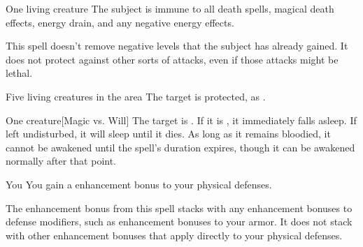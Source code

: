 \spellrng{\rngclose}
\spelldur{\durshort}
\begin{spelltarget}{One living creature}
    \spelleffect The subject is immune to all death spells, magical death effects, energy drain, and any negative energy effects.
\end{spelltarget}
\spellnotes This spell doesn't remove negative levels that the subject has already gained. It does not protect against other sorts of attacks, even if those attacks might be lethal.

\spelldur{\durshort}
\begin{spelltarget}{Five living creatures in the area}
    \spelleffect The target is protected, as .
\end{spelltarget}

\spellrng{\rngmed}
\spelldur{\durlong}
\begin{spelltarget}{One creature}[Magic vs. Will]
    \spellsuccess The target is \bewildered. If it is \bloodied, it immediately falls asleep. If left undisturbed, it will sleep until it dies. As long as it remains bloodied, it cannot be awakened until the spell's duration expires, though it can be awakened normally after that point.
\end{spelltarget}

\spelldur{\durlong}
\begin{spelltarget}{You}
    \spelleffect You gain a  enhancement bonus to your physical defenses. \spellbonusscalingdescription
\end{spelltarget}
\spellnotes The enhancement bonus from this spell stacks with any enhancement bonuses to defense modifiers, such as enhancement bonuses to your armor. It does not stack with other enhancement bonuses that apply directly to your physical defenses. 

